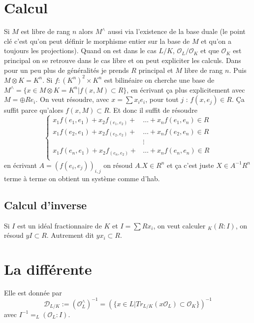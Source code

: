 \documentclass[a4paper,12pt]{book}
\newcommand{\Or}{\mathcal{O}}
\newcommand{\D}{\mathscr{D}}
\theoremstyle{plain}
\theoremstyle{definition}
\theoremstyle{remark}
\begin{document}
\section{Calcul}
Si $M$ est libre de rang $n$ alors $M^\wedge$ aussi via 
l'existence de la base duale (le point clé c'est qu'on peut
définir le morphisme entier sur la base de $M$ et qu'on a toujours
les projections). Quand on est dans le cas $L/K$, $\Or_L/\Or_K$ 
et que $\Or_K$ est principal on se retrouve dans le cas libre et
on peut expliciter les calculs. Dans pour un peu plus de généralités
je prends $R$ principal et $M$ libre de rang $n$. Puis $M\otimes K=K^n$.
Si $f\colon (K^n)^2\times K^n$ est bilinéaire on cherche une base de
$M^\wedge=\{x\in M\otimes K=K^n|f(x,M)\subset R\}$, en écrivant ça plus
explicitement avec $M=\oplus Re_i$. On veut résoudre, avec $x=\sum x_ie_i$,
pour tout $j$ : $f(x,e_j)\in R$. Ça suffit parce qu'alors $f(x,M)\subset R$.
Et donc il suffit de résoudre 
\[\begin{cases}x_1f(e_1,e_1)+x_2f_(e_1,e_2)+&\ldots+x_nf(e_1,e_n)\in R\\
x_1f(e_2,e_1)+x_2f_(e_2,e_2)+&\ldots+x_nf(e_2,e_n)\in R\\
                             &\vdots\\
x_1f(e_n,e_1)+x_2f_(e_n,e_2)+&\ldots+x_nf(e_n,e_n)\in R\\
\end{cases}\]
en écrivant $A=(f(e_i,e_j))_{i,j}$ on résoud $A.X\in R^n$ et ça
c'est juste $X\in A^{-1}R^n$ terme à terme on obtient un système
comme d'hab.

\subsection{Calcul d'inverse}
Si $I$ est un idéal fractionnaire de $K$ et $I=\sum Rx_i$, on veut calculer
$_K(R:I)$, on résoud $yI\subset R$. Autrement dit $yx_i\subset R$.

\section{La différente}
Elle est donnée par 
\[\D_{L/K}:=(\Or_L^\wedge)^{-1}=(\{x\in L| Tr_{L/K}(x\Or_L)\subset \Or_K\})^{-1}\]
avec $I^{-1}=_L(\Or_L:I)$.
\end{document}
